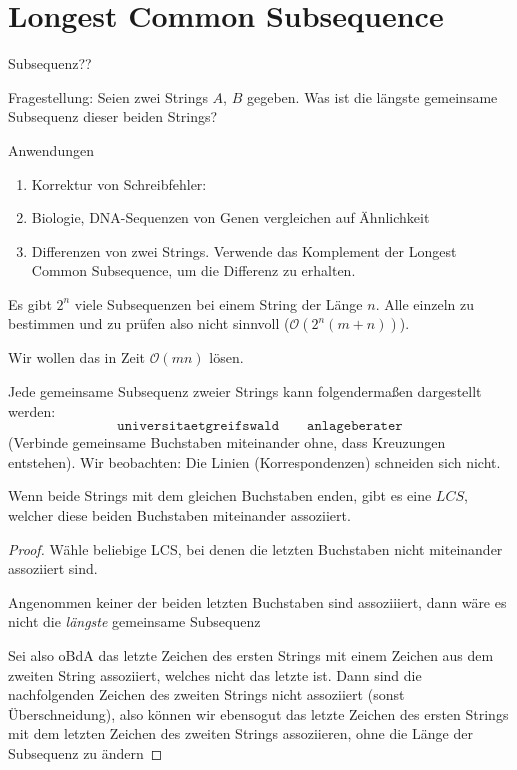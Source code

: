 \documentclass{mycourse}
\renewcommand{\O}{\mathcal{O}}
\begin{document}
\section{Longest Common Subsequence}

\begin{df}[Subsequenz]
	Subsequenz??
\end{df}

\begin{seg}{Fragestellung:}
	Seien zwei Strings $A$, $B$ gegeben.
	Was ist die längste gemeinsame Subsequenz dieser beiden Strings?
\end{seg}

\begin{seg}{Anwendungen}
	\begin{enumerate}
		\item
			Korrektur von Schreibfehler:
		\item
			Biologie, DNA-Sequenzen von Genen vergleichen auf Ähnlichkeit
		\item
			Differenzen von zwei Strings.
			Verwende das Komplement der Longest Common Subsequence, um die Differenz zu erhalten.
	\end{enumerate}
\end{seg}

Es gibt $2^n$ viele Subsequenzen bei einem String der Länge $n$.
Alle einzeln zu bestimmen und zu prüfen also nicht sinnvoll ($\O(2^n(m+n))$).

Wir wollen das in Zeit $\O(mn)$ lösen.

Jede gemeinsame Subsequenz zweier Strings kann folgendermaßen dargestellt werden:
\[
	\texttt{universitaetgreifswald} \qquad \texttt{anlageberater}
\]
(Verbinde gemeinsame Buchstaben miteinander ohne, dass Kreuzungen entstehen).
Wir beobachten: Die Linien (Korrespondenzen) schneiden sich nicht.

\begin{st}
	Wenn beide Strings mit dem gleichen Buchstaben enden, gibt es eine $LCS$, welcher diese beiden Buchstaben miteinander assoziiert.
	\begin{proof}
		Wähle beliebige LCS, bei denen die letzten Buchstaben nicht miteinander assoziiert sind.

		Angenommen keiner der beiden letzten Buchstaben sind assoziiiert, dann wäre es nicht die \emph{längste} gemeinsame Subsequenz

		Sei also oBdA das letzte Zeichen des ersten Strings mit einem Zeichen aus dem zweiten String assoziiert, welches nicht das letzte ist.
		Dann sind die nachfolgenden Zeichen des zweiten Strings nicht assoziiert (sonst Überschneidung), also können wir ebensogut das letzte Zeichen des ersten Strings mit dem letzten Zeichen des zweiten Strings assoziieren, ohne die Länge der Subsequenz zu ändern
	\end{proof}
\end{st}
\end{document}
